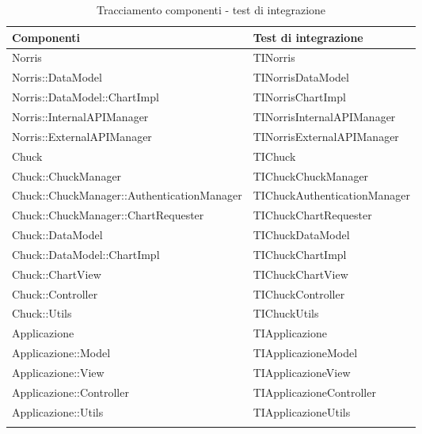 	\begin{longtabu}{| X | X[0.8] |}

			\hline
			\rowfont{\bf}
			Componenti	&	Test di integrazione \\ \hline 
			\endhead


			Norris & TINorris \\ \hline 
			Norris::DataModel & TINorrisDataModel \\ \hline 
			Norris::DataModel::ChartImpl & TINorrisChartImpl \\ \hline 
			Norris::InternalAPIManager & TINorrisInternalAPIManager \\ \hline 
			Norris::ExternalAPIManager & TINorrisExternalAPIManager \\ \hline 
			Chuck & TIChuck \\ \hline 
			Chuck::ChuckManager & TIChuckChuckManager \\ \hline 
			Chuck::ChuckManager::AuthenticationManager & TIChuckAuthenticationManager \\ \hline 
			Chuck::ChuckManager::ChartRequester & TIChuckChartRequester \\ \hline 
			Chuck::DataModel & TIChuckDataModel \\ \hline 
			Chuck::DataModel::ChartImpl & TIChuckChartImpl \\ \hline 
			Chuck::ChartView & TIChuckChartView \\ \hline 
			Chuck::Controller & TIChuckController \\ \hline 
			Chuck::Utils & TIChuckUtils \\ \hline 
			Applicazione & TIApplicazione \\ \hline 
			Applicazione::Model & TIApplicazioneModel \\ \hline 
			Applicazione::View & TIApplicazioneView \\ \hline 
			Applicazione::Controller & TIApplicazioneController \\ \hline 
			Applicazione::Utils & TIApplicazioneUtils \\ \hline 




	\caption{Tracciamento componenti - test di integrazione}

\end{longtabu}
